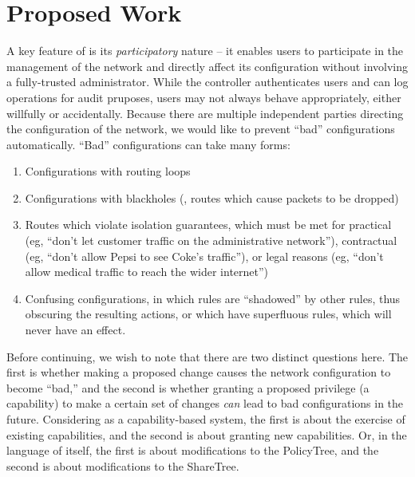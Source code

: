 

\chapter{Proposed Work}
\label{sec:proposed}

A key feature of \sys is its \emph{participatory} nature -- it enables
users to participate in the management of the network and directly affect its 
configuration without involving a fully-trusted administrator.
While the \sys controller authenticates users and can log operations for
audit pruposes, users may not always behave appropriately, either willfully 
or accidentally. Because there are multiple independent parties directing the 
configuration of the network, we would like to prevent ``bad''
configurations automatically. ``Bad'' configurations can take many forms:

{\singlespacing
\begin{enumerate}
\item Configurations with routing loops 
\item Configurations with blackholes (\ie, routes which cause packets to be dropped)
\item Routes which violate isolation guarantees, which must be met for practical 
(eg, ``don't let customer traffic on the administrative network''), contractual 
(eg, ``don't allow Pepsi to see Coke's traffic''), or legal reasons (eg, ``don't 
allow medical traffic to reach the wider internet'')
\item Confusing configurations, in which rules are ``shadowed'' by other rules, thus 
obscuring the resulting actions, or which have superfluous rules, which will 
never have an effect.
\end{enumerate}
}

Before continuing, we wish to note that there are two distinct questions here. 
The first is whether making a proposed change causes the network configuration to 
become ``bad,'' and the second is whether granting a proposed privilege
(a capability) to make a certain set of changes \emph{can} lead to bad
configurations in the future. Considering \sys as a capability-based system, 
the first is about the exercise of existing capabilities, and the second is 
about granting new capabilities. Or, in the language of \sys itself, the first 
is about modifications to the PolicyTree, and the second is about modifications 
to the ShareTree.

